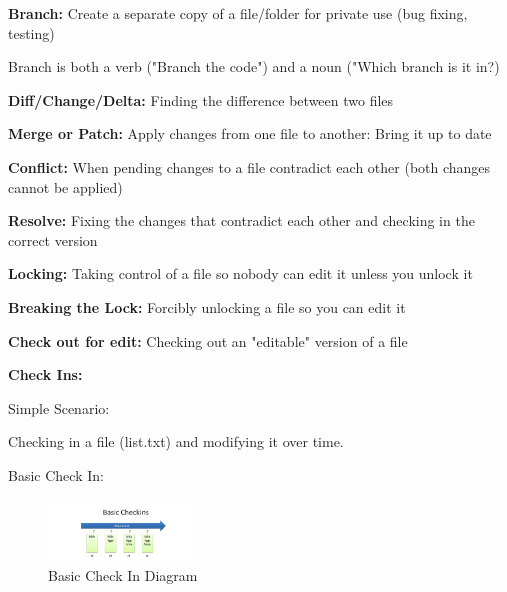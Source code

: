 \documentclass{article}
\begin{document}
\begin{flushleft}
\textbf{Branch:} Create a separate copy of a file/folder for private use (bug fixing, testing) \par
Branch is both a verb ("Branch the code") and a noun ("Which branch is it in?) \\
\par

\textbf{Diff/Change/Delta:} Finding the difference between two files \\
\par

\textbf{Merge or Patch:} Apply changes from one file to another: Bring it up to date \\
\par

\textbf{Conflict:} When pending changes to a file contradict each other (both changes cannot be applied) \\
\par

\textbf{Resolve:} Fixing the changes that contradict each other and checking in the correct version \\
\par

\textbf{Locking:} Taking control of a file so nobody can edit it unless you unlock it \\
\par

\textbf{Breaking the Lock:} Forcibly unlocking a file so you can edit it \\
\par

\textbf{Check out for edit:} Checking out an "editable" version of a file \\
\par

\textbf{Check Ins:} \\
\par

Simple Scenario: \\
\par

Checking in a file (list.txt) and modifying it over time.

Basic Check  In:

\begin{figure}[htp]
\centering
\includegraphics[width=4cm]{BasicCheckIn.png}
\caption{Basic Check In Diagram}
\label{fig:BCIDiagram}
\end{figure} 



\end{flushleft}
\end{document}

